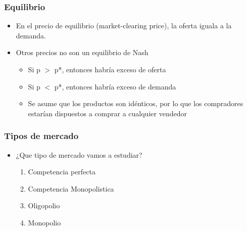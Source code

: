 \documentclass{beamer}
\begin{document}
\begin{frame}
\frametitle{Equilibrio}
\begin{itemize}
    \item En el precio de equilibrio (market-clearing price), la oferta iguala a la demanda.\vspace{4mm}
    \item Otros precios no son un equilibrio de Nash\vspace{2mm}
    \begin{itemize}
        \item Si p $>$ p*, entonces habría exceso de oferta \\\vspace{1mm}
        \item Si p $<$ p*, entonces habría exceso de demanda \\\vspace{1mm}
        \item Se asume que los productos son idénticos, por lo que los compradores estarían dispuestos a comprar a cualquier vendedor
    \end{itemize}
\end{itemize}
\end{frame}

\begin{frame}
\frametitle{Tipos de mercado}
\begin{itemize}
    \item ¿Que tipo de mercado vamos a estudiar?\vspace{2mm}
    \begin{enumerate}
        \item Competencia perfecta\vspace{1mm}
        \item Competencia Monopolistica\vspace{1mm}
        \item Oligopolio\vspace{1mm}
        \item Monopolio \vspace{1mm}
    \end{enumerate}
\end{itemize}
\end{frame}
\end{document}
